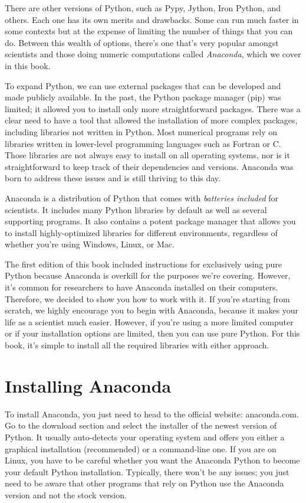 There are other versions of Python, such as Pypy, Jython, Iron Python, and others. Each one has its own merits and drawbacks. Some can run much faster in some contexts but at the expense of limiting the number of things that you can do. Between this wealth of options, there's one that's very popular amongst scientists and those doing numeric computations called \emph{Anaconda}, which we cover in this book.

To expand Python, we can use external packages that can be developed and made publicly available. In the past, the Python package manager (pip) was limited; it allowed you to install only more straightforward packages. There was a clear need to have a tool that allowed the installation of more complex packages, including libraries not written in Python. Most numerical programs rely on libraries written in lower-level programming languages such as Fortran or C. Those libraries are not always easy to install on all operating systems, nor is it straightforward to keep track of their dependencies and versions. Anaconda was born to address these issues and is still thriving to this day.

Anaconda is a distribution of Python that comes with \emph{batteries included} for scientists. It includes many Python libraries by default as well as several supporting programs. It also contains a potent package manager that allows you to install highly-optimized libraries for different environments, regardless of whether you're using Windows, Linux, or Mac.

The first edition of this book included instructions for exclusively using pure Python because Anaconda is overkill for the purposes we're covering. However, it's common for researchers to have Anaconda installed on their computers. Therefore, we decided to show you how to work with it. If you're starting from scratch, we highly encourage you to begin with Anaconda, because it makes your life as a scientist much easier. However, if you're using a more limited computer or if your installation options are limited, then you can use pure Python. For this book, it's simple to install all the required libraries with either approach.

\section{Installing Anaconda}\label{sec:installing-anaconda}
To install Anaconda, you just need to head to the official website: anaconda.com. Go to the download section and select the installer of the newest version of Python. It usually auto-detects your operating system and offers you either a graphical installation (recommended) or a command-line one. If you are on Linux, you have to be careful whether you want the Anaconda Python to become your default Python installation. Typically, there won't be any issues; you just need to be aware that other programs that rely on Python use the Anaconda version and not the stock version.

